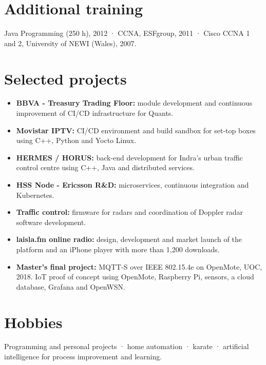 \documentclass[10pt,a4paper]{article}
\begin{document}
\section{Additional training}
Java Programming (250 h), 2012 · CCNA, ESFgroup, 2011 · Cisco CCNA 1 and 2, University of NEWI (Wales), 2007.

\section{Selected projects}
\begin{itemize}
  \item \textbf{BBVA - Treasury Trading Floor:} module development and continuous improvement of CI/CD infrastructure for Quants.
  \item \textbf{Movistar IPTV:} CI/CD environment and build sandbox for set-top boxes using C++, Python and Yocto Linux.
  \item \textbf{HERMES / HORUS:} back-end development for Indra's urban traffic control centre using C++, Java and distributed services.
  \item \textbf{HSS Node - Ericsson R\&D:} microservices, continuous integration and Kubernetes.
  \item \textbf{Traffic control:} firmware for radars and coordination of Doppler radar software development.
  \item \textbf{laisla.fm online radio:} design, development and market launch of the platform and an iPhone player with more than 1,200 downloads.
  \item \textbf{Master's final project:} MQTT-S over IEEE 802.15.4e on OpenMote, UOC, 2018. IoT proof of concept using OpenMote, Raspberry Pi, sensors, a cloud database, Grafana and OpenWSN.
\end{itemize}

\section{Hobbies}
Programming and personal projects · home automation · karate · artificial intelligence for process improvement and learning.
\end{document}
